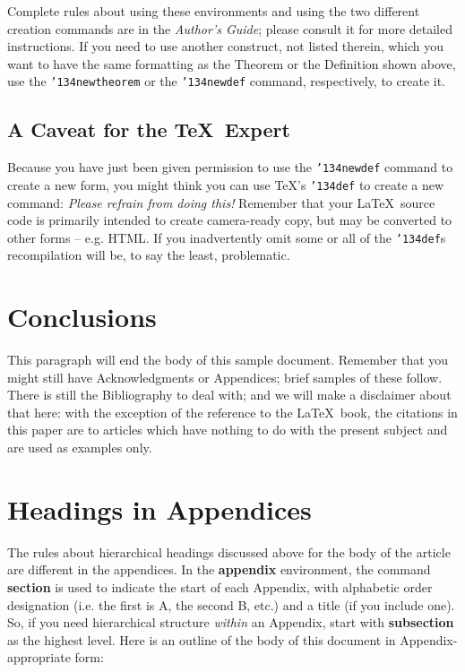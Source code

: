 \documentclass{sig-alternate}
\begin{document}
Complete rules about using these environments and using the
two different creation commands are in the
\textit{Author's Guide}; please consult it for more
detailed instructions.  If you need to use another construct,
not listed therein, which you want to have the same
formatting as the Theorem
or the Definition\cite{salas:calculus} shown above,
use the \texttt{{\char'134}newtheorem} or the
\texttt{{\char'134}newdef} command,
respectively, to create it.

\subsection*{A {\secit Caveat} for the \TeX\ Expert}
Because you have just been given permission to
use the \texttt{{\char'134}newdef} command to create a
new form, you might think you can
use \TeX's \texttt{{\char'134}def} to create a
new command: \textit{Please refrain from doing this!}
Remember that your \LaTeX\ source code is primarily intended
to create camera-ready copy, but may be converted
to other forms -- e.g. HTML. If you inadvertently omit
some or all of the \texttt{{\char'134}def}s recompilation will
be, to say the least, problematic.

\section{Conclusions}
This paragraph will end the body of this sample document.
Remember that you might still have Acknowledgments or
Appendices; brief samples of these
follow.  There is still the Bibliography to deal with; and
we will make a disclaimer about that here: with the exception
of the reference to the \LaTeX\ book, the citations in
this paper are to articles which have nothing to
do with the present subject and are used as
examples only.

%

%
%
\appendix
\section{Headings in Appendices}
The rules about hierarchical headings discussed above for
the body of the article are different in the appendices.
In the \textbf{appendix} environment, the command
\textbf{section} is used to
indicate the start of each Appendix, with alphabetic order
designation (i.e. the first is A, the second B, etc.) and
a title (if you include one).  So, if you need
hierarchical structure
\textit{within} an Appendix, start with \textbf{subsection} as the
highest level. Here is an outline of the body of this
document in Appendix-appropriate form:
\end{document}
